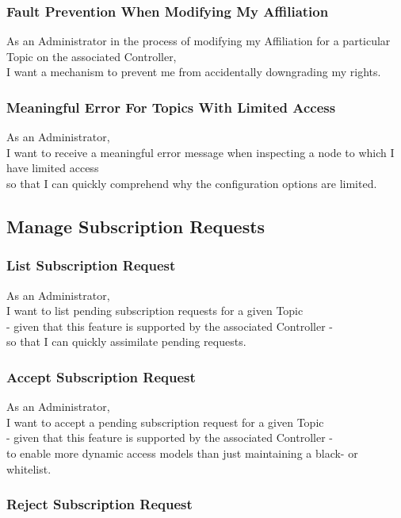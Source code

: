 \subsubsection{Fault Prevention When Modifying My Affiliation}

As an Administrator in the process of modifying my Affiliation for a particular Topic on the associated Controller,\\
I want a mechanism to prevent me from accidentally downgrading my rights.

\subsubsection{Meaningful Error For Topics With Limited Access}

As an Administrator,\\
I want to receive a meaningful error message when inspecting a node to which I have limited access \\
so that I can quickly comprehend why the configuration options are limited.

\subsection{Manage Subscription Requests}

\subsubsection{List Subscription Request}
As an Administrator,\\
I want to list pending subscription requests for a given Topic\\
- given that this feature is supported by the associated Controller -\\
so that I can quickly assimilate pending requests.

\subsubsection{Accept Subscription Request}

As an Administrator,\\
I want to accept a pending subscription request for a given Topic\\
- given that this feature is supported by the associated Controller -\\
to enable more dynamic access models than just maintaining a black- or whitelist.

\subsubsection{Reject Subscription Request}

